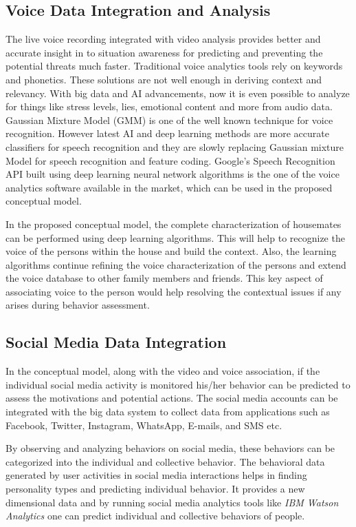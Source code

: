 \documentclass[sigconf]{acmart}
\begin{document}
\subsection{Voice Data Integration and Analysis}
The live voice recording integrated with video analysis provides better and accurate insight in to situation awareness for predicting and preventing the potential threats much faster. Traditional voice analytics tools rely on keywords and phonetics. These solutions are not well enough in deriving context and relevancy. With big data and AI advancements, now it is even possible to analyze for things like stress levels, lies, emotional content and more from audio data. Gaussian Mixture Model (GMM) is one of the well known technique for voice recognition. However latest AI and deep learning methods are more accurate classifiers for speech recognition and they are slowly replacing Gaussian mixture Model for speech recognition and feature coding. Google's Speech Recognition API built using deep learning neural network algorithms is the one of the voice analytics software available in the market, which can be used in the proposed conceptual model.

In the proposed conceptual model, the complete characterization of housemates can be performed using deep learning algorithms. This will help to recognize the voice of the persons within the house and build the context. Also, the learning algorithms continue refining the voice characterization of the persons and extend the voice database to other family members and friends. This key aspect of associating voice to the person would help resolving the contextual issues if any arises during behavior assessment.

\subsection{Social Media Data Integration}
In the conceptual model, along with the video and voice association, if the individual social media activity is monitored his/her behavior can be predicted to assess the motivations and potential actions. The social media accounts can be integrated with the big data system to collect data from applications such as Facebook, Twitter, Instagram, WhatsApp, E-mails, and SMS etc.

By observing and analyzing behaviors on social media, these behaviors can be categorized into the individual and collective behavior. The behavioral data generated by user activities in social media interactions  helps in finding personality types and predicting individual behavior. It provides a new dimensional data 
and by running social media analytics tools like \textit{IBM Watson Analytics} one can predict individual and collective behaviors of people.
\end{document}
